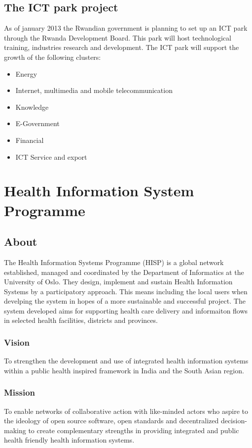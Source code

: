 \subsection{The ICT park project}
As of january 2013 the Rwandian government is planning to set up an ICT park through the Rwanda Development Board.
This park will host technological training, industries research and development. The ICT park will support the growth of the following clusters:
\begin{itemize}
\item Energy
\item Internet, multimedia and mobile telecommunication
\item Knowledge
\item E-Government
\item Financial
\item ICT Service and export
\end{itemize}
\cite{2}



\section{Health Information System Programme}
\subsection{About}
The Health Information Systems Programme (HISP) is a global network established, managed and coordinated by the Department of Informatics at the University of Oslo.
They design, implement and sustain Health Information Systems by a participatory approach\cite{8}. This means including the local users when develping the system in hopes of a more sustainable and successful project.
The system developed aims for supporting health care delivery and informaiton flows in selected health facilities, districts and provinces.
\subsubsection{Vision}
To strengthen the development and use of integrated health information systems within a public health inspired framework in India and the South Asian region\cite{9}.
\subsubsection{Mission}
To enable networks of collaborative action with like-minded actors who aspire to the ideology of open source software, open standards and decentralized decision-making to create complementary strengths in providing integrated and public health friendly health information systems\cite{9}.
